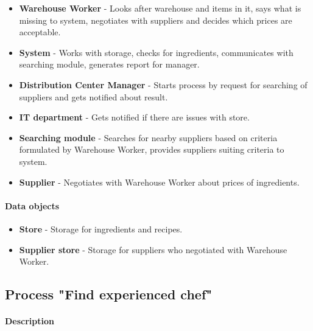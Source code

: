 \documentclass[11pt,a4paper]{article}
\begin{document}
\begin{itemize}
    \item \textbf{Warehouse Worker} - Looks after warehouse and items in it, says what is missing to system, negotiates with suppliers and decides which prices are acceptable.
    \item \textbf{System} - Works with storage, checks for ingredients, communicates with searching module, generates report for manager.
    \item \textbf{Distribution Center Manager} - Starts process by request for searching of suppliers and gets notified about result.
    \item \textbf{IT department} - Gets notified if there are issues with store.
    \item \textbf{Searching module} - Searches for nearby suppliers based on criteria formulated by Warehouse Worker, provides suppliers suiting criteria to system.
    \item \textbf{Supplier} - Negotiates with Warehouse Worker about prices of ingredients.
    
\end{itemize}

\paragraph{Data objects}

\begin{itemize}
    \item \textbf{Store} - Storage for ingredients and recipes.
    \item \textbf{Supplier store} - Storage for suppliers who negotiated with Warehouse Worker.
\end{itemize}

\newpage




\subsection{Process "Find experienced chef"}

\paragraph{Description}
\end{document}
